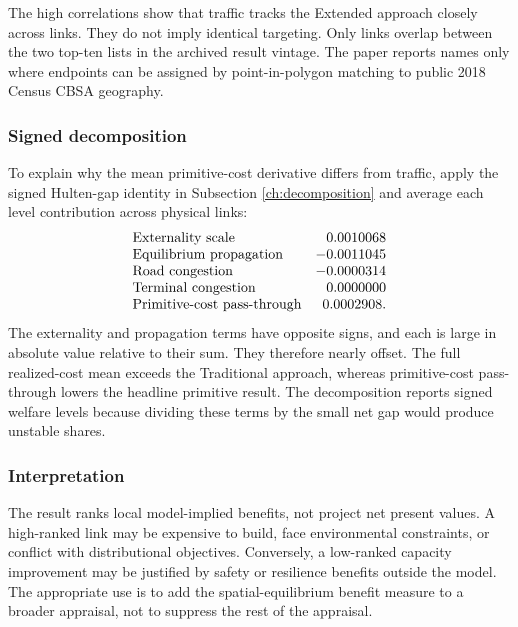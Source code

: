
The high correlations show that traffic tracks the Extended approach closely
across links.
They do not imply identical targeting. Only \GuideRSUETopTenOverlap{} links
overlap between the two top-ten lists in the archived result vintage. The
paper reports names only where endpoints can be assigned by point-in-polygon
matching to public 2018 Census CBSA geography.

\subsubsection{Signed decomposition}

To explain why the mean primitive-cost derivative differs from traffic, apply the
signed Hulten-gap identity in Subsection \ref{ch:decomposition} and average each
level contribution across physical links:
\[
\begin{array}{lr}
\text{Externality scale} & 0.0010068\\
\text{Equilibrium propagation} & -0.0011045\\
\text{Road congestion} & -0.0000314\\
\text{Terminal congestion} & 0.0000000\\
\text{Primitive-cost pass-through} & 0.0002908 .
\end{array}
\]
The externality and propagation terms have opposite signs, and each is large
in absolute value relative to their sum. They therefore nearly offset. The
full realized-cost mean exceeds the Traditional approach, whereas primitive-cost
pass-through lowers the headline primitive result. The decomposition reports
signed welfare levels because dividing these terms by the small net gap would
produce unstable shares.

\subsubsection{Interpretation}

The result ranks local model-implied benefits, not project net present values.
A high-ranked link may be expensive to build, face environmental constraints,
or conflict with distributional objectives. Conversely, a low-ranked capacity
improvement may be justified by safety or resilience benefits outside the
model. The appropriate use is to add the spatial-equilibrium benefit measure
to a broader appraisal, not to suppress the rest of the appraisal.

